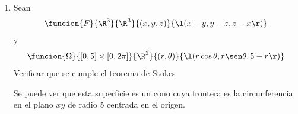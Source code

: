 \documentclass[a4,11pt]{aleph-examen}
\begin{document}
\begin{preguntas}
\begin{respuesta}
\begin{respuesta}
\begin{respuesta}
\begin{enumerate}
\begin{respuesta}
    \noindent Para el término $\oint_{\delta S}{f\cdot ds}$, considere las parametrizaciones $\func{\alpha_1, \alpha_2, \alpha_3}{[0,1]}{\R^3}$ definidas por 
    \begin{align*}
    \alpha_1(t) &= (1-t,t,0)\\
    \alpha_2(t) &= (0,1-t,t)\\
    \alpha_3(t) &= (t,0,1-t)
    \end{align*}    
    que unen los puntos (1,0,0) con (0,0,1), (0,1,0) con (0,0,1) y (0,0,1) con (1,0,0) respectivamente. A partir de lo anterior, se puede comprobar que 
    \begin{align*}
    \oint_{\delta S}{f\cdot ds} &= \int_{\alpha_1}{f\cdot ds} + \int_{\alpha_2}{f\cdot ds} + \int_{\alpha_3}{f\cdot ds}\\
    &= 3\int_{0}^{1}{(-1+2t-t^2)\,dt}\\
    &= -1.
    \end{align*}
    Entonces, $\iint_{S}{\mbox{rot}(f)\cdot dS} = \oint_{\delta S}{f\cdot ds}.$     Por lo cual, se ha mostrado que para el campo vectorial dado y la superficie $S$ se cumple el teorema de Stokes.
\end{respuesta}
\item 
Sean
	\[
	\funcion{F}{\R^3}{\R^3}{(x,y,z)}{\l(x-y,y-z,z-x\r)}
	\]
y
	\[
	\funcion{\Omega}{[0,5]\times[0,2\pi]}{\R^3}{(r,\theta)}{\l(r \cos \theta, r \sen \theta, 5-r\r)}
	\]
Verificar que se cumple el teorema de Stokes

\begin{respuesta}
Se puede ver que esta superficie es un cono cuya frontera es la circunferencia en el plano $xy$ de radio 5 centrada en el origen.


\end{respuesta}
\end{enumerate}
\end{respuesta}
\end{respuesta}
\end{respuesta}
\end{preguntas}
\end{document}
